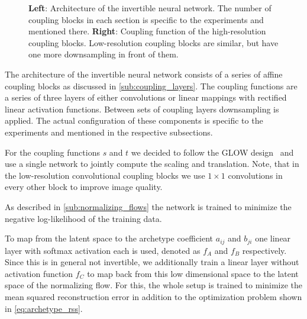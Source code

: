 \begin{figure}[htpb]
\begin{center}
\begin{subfigure}[]{0.45\textwidth}
\begin{center}
			\end{center}
		\end{subfigure}
	\end{center}
        \caption{\textbf{Left}: Architecture of the invertible neural network. The number of
		coupling blocks in each section is specific to the experiments and
            mentioned there. \textbf{Right}: Coupling function of the
        high-resolution coupling blocks. Low-resolution coupling blocks are
    similar, but have one more downsampling in front of them.}%
	\label{fig:inn_contents}
\end{figure}

The architecture of the invertible neural network consists of a series of
affine coupling blocks as discussed in \autoref{sub:coupling_layers}. The
coupling functions are a series of three layers of either convolutions or
linear mappings with rectified linear activation functions. Between sets of
coupling layers downsampling is applied. The actual configuration of these
components is specific to the experiments and mentioned in the respective
subsections.

For the coupling functions $s$ and $t$ we decided to follow the GLOW
design~\citep{kingmaGlowGenerativeFlow2018} and use a single network to jointly
compute the scaling and translation. Note, that in the low-resolution
convolutional coupling blocks we use $1\times 1$ convolutions in every other
block to improve image quality.

As described in \autoref{sub:normalizing_flows} the network is trained to
minimize the negative log-likelihood of the training data.

To map from the latent space to the archetype coefficient $a_{ij}$ and $b_{ji}$
one linear layer with softmax activation each is used, denoted as $f_A$ and
$f_B$ respectively. Since this is in general not invertible, we additionally
train a linear layer without activation function $f_C$ to map back from this
low dimensional space to the latent space of the normalizing flow. For this,
the whole setup is trained to minimize the mean squared reconstruction error in
addition to the optimization problem shown in \autoref{eq:archetype_rss}.

